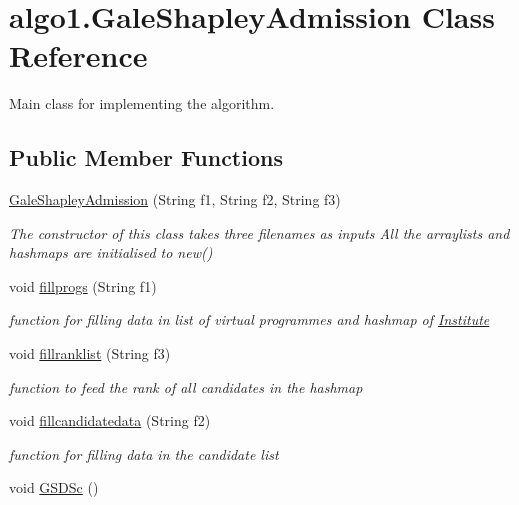 \hypertarget{classalgo1_1_1GaleShapleyAdmission}{\section{algo1.\+Gale\+Shapley\+Admission Class Reference}
\label{classalgo1_1_1GaleShapleyAdmission}
}


Main class for implementing the algorithm.  


\subsection*{Public Member Functions}
\begin{DoxyCompactItemize}
\item 
\hyperlink{classalgo1_1_1GaleShapleyAdmission_a1f0c35533697a9cb355f77e595cb90c9}{Gale\+Shapley\+Admission} (String f1, String f2, String f3)
\begin{DoxyCompactList}\small\item\em The constructor of this class takes three filenames as inputs All the arraylists and hashmaps are initialised to new() \end{DoxyCompactList}\item 
void \hyperlink{classalgo1_1_1GaleShapleyAdmission_acd76a7c612f3bbbef2039c0a000425bc}{fillprogs} (String f1)
\begin{DoxyCompactList}\small\item\em function for filling data in list of virtual programmes and hashmap of \hyperlink{classalgo1_1_1Institute}{Institute}~\newline
 \end{DoxyCompactList}\item 
void \hyperlink{classalgo1_1_1GaleShapleyAdmission_a6910d1baa70d9d62133e75c8953d08d4}{fillranklist} (String f3)
\begin{DoxyCompactList}\small\item\em function to feed the rank of all candidates in the hashmap \end{DoxyCompactList}\item 
void \hyperlink{classalgo1_1_1GaleShapleyAdmission_a2ecccd278d3e3bc84fe56ca33db34371}{fillcandidatedata} (String f2)
\begin{DoxyCompactList}\small\item\em function for filling data in the candidate list \end{DoxyCompactList}\item 
\hypertarget{classalgo1_1_1GaleShapleyAdmission_ab48d97208cfb538bbc827a56c9e69211}{void \hyperlink{classalgo1_1_1GaleShapleyAdmission_ab48d97208cfb538bbc827a56c9e69211}{G\+S\+D\+Sc} ()}\label{classalgo1_1_1GaleShapleyAdmission_ab48d97208cfb538bbc827a56c9e69211}


\end{DoxyCompactItemize}
